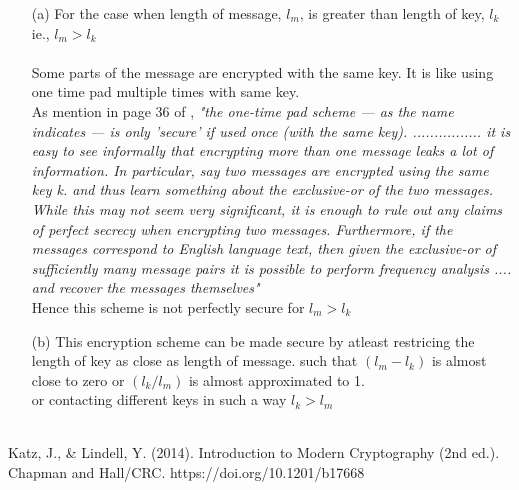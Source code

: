 \begin{itemize}
    \item[(a)]
        For the case when length of message, $l_m$, is greater than  length of key,  $l_k$ ie., $l_m > l_k$\\\\
        Some parts of the message are encrypted with the same key. It is like using
        one time pad multiple times with same key. \\
        
        As mention in page 36 of \cite{texbook}, \textit{"the one-time pad scheme — as the name indicates — is
        only 'secure' if used once (with the same key). ................ it is easy to see
        informally that encrypting more than one message leaks a lot of information.
        In particular, say two messages are encrypted using the same key k.
        and thus learn something about the exclusive-or of the two messages. While
        this may not seem very significant, it is enough to rule out any claims of perfect
        secrecy when encrypting two messages. Furthermore, if the messages correspond to
         English language text, then given the exclusive-or of sufficiently
        many message pairs it is possible to perform frequency analysis .... and recover the messages themselves"}\\

        Hence this scheme is not perfectly secure for $l_m > l_k$\\

    \item[(b)]
        This encryption scheme can be made secure by atleast restricing the length of key as close as length of message.
        such that $ (l_m - l_k) $ is almost close to zero or $ (l_k / l_m) $ is almost approximated to 1. \\
    
        or contacting different keys in such a way $l_k > l_m$\\\\ 
\end{itemize}

\begin{thebibliography}{9} 
    Katz, J., \& Lindell, Y. (2014). Introduction to Modern Cryptography (2nd ed.). Chapman and Hall/CRC. https://doi.org/10.1201/b17668

\end{thebibliography}


